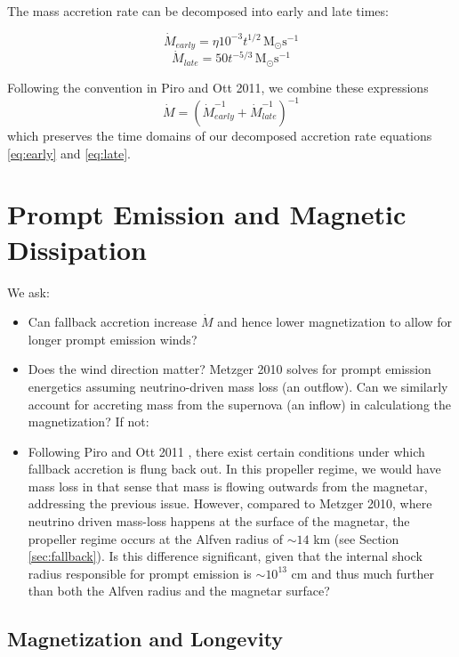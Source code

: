 \documentclass{article}
\begin{document}
The mass accretion rate can be decomposed into early and late times:

\begin{equation} \label{eq:early}
\dot{M}_{early} = \eta 10^{-3}t^{1/2} \, \mathrm{M_{\odot }s^{-1}}
\end{equation}
\begin{equation} \label{eq:late}
\dot{M}_{late}=50 t^{-5/3}\, \mathrm{M_{\odot} s^{-1}}
\end{equation}

Following the convention in Piro and Ott 2011, we combine these expressions
\begin{equation}
\dot{M}=(\dot{M}_{early}^{-1}+\dot{M}_{late}^{-1})^{-1}
\end{equation}
which preserves the time domains of our decomposed accretion rate equations \ref{eq:early} and \ref{eq:late}.
\section{Prompt Emission and Magnetic Dissipation} \label{sec:prompt}

We ask:

\begin{itemize}
\item Can fallback accretion increase $\dot{M}$ and hence lower magnetization to allow for longer prompt emission winds?
\item Does the wind direction matter? Metzger 2010 \cite {Metzger:2010pp} solves for prompt emission energetics assuming neutrino-driven mass loss (an outflow). Can we similarly account for accreting mass from the supernova (an inflow) in calculationg the magnetization? If not:
\item Following Piro and Ott 2011 \cite {Piro:2011ed}, there exist certain conditions under which fallback accretion is flung back out. In this propeller regime, we would have mass loss in that sense that mass is flowing outwards from the magnetar, addressing the previous issue. However, compared to Metzger 2010, where neutrino driven mass-loss happens at the surface of the magnetar, the propeller regime occurs at the Alfven radius of $\sim 14$ km (see Section \ref{sec:fallback}). Is this difference significant, given that the internal shock radius responsible for prompt emission is $\sim 10^{13}$ cm and thus much further than both the Alfven radius and the magnetar surface?
\end{itemize}

\subsection{Magnetization and Longevity}
\end{document}
